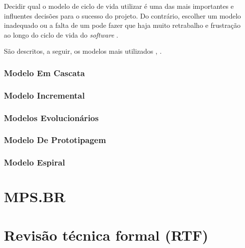 Decidir qual o modelo de ciclo de vida utilizar é uma das mais importantes e influentes decisões para o sucesso do projeto. Do contrário, escolher um modelo inadequado ou a falta de um pode fazer que haja muito retrabalho e frustração ao longo do ciclo de vida do \textit{software} \cite{MCCONNELL1996}.

São descritos, a seguir,  os modelos mais utilizados \cite{SOMMERVILLE2008}, \cite{PRESSMAN2006}.

\subsubsection{Modelo Em Cascata}
\subsubsection{Modelo Incremental}
\subsubsection{Modelos Evolucionários}
\subsubsection{Modelo De Prototipagem}
\subsubsection{Modelo Espiral}



















\section{MPS.BR}






\section{Revisão técnica formal (RTF)}